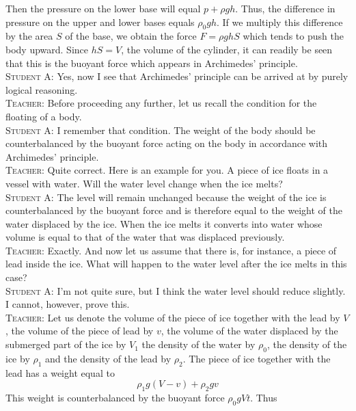 \documentclass[a4paper,sfsidenotes]{tufte-book}
\begin{document}
Then the pressure on the lower base will equal $p+\rho gh$. Thus, the difference in pressure on the upper and lower bases equals $\rho_{0}gh$. If we multiply this difference by the area $S$ of the base, we obtain the force $F=\rho ghS$ which tends to push the body upward. Since $hS=V$, the volume of the cylinder, it can readily be seen that this is the buoyant force which appears in Archimedes' principle.
\\
\textsc{Student A:} Yes, now I see that Archimedes' principle can be arrived at by purely logical reasoning.
\\
\textsc{Teacher:} Before proceeding any further, let us recall the condition for the floating of a body.
\\
\textsc{Student A:} I remember that condition. The weight of the body should be counterbalanced by the buoyant force acting on the body in accordance with Archimedes' principle.
\\
\textsc{Teacher:} Quite correct. Here is an example for you. A piece of ice floats in a vessel with water. Will the water level change when the ice melts?
\\
\textsc{Student A:} The level will remain unchanged because the weight of the ice is counterbalanced by the buoyant force and is therefore equal to the weight of the water displaced by the ice. When the ice melts it converts into water whose volume is equal to that of the water that was displaced previously.
\\
\textsc{Teacher:} Exactly. And now let us assume that there is, for instance, a piece of lead inside the ice. What will happen to the water level after the ice melts in this case?
\\
\textsc{Student A:} I'm not quite sure, but I think the water level should reduce slightly. I cannot, however, prove this.
\\
\textsc{Teacher:} Let us denote the volume of the piece of ice together with the lead by $V$, the volume of the piece of lead by $v$, the volume of the water displaced by the submerged part of the ice by $V_{1}$ the density of the water by $\rho_{0}$, the density of the ice by $\rho_{1}$ and the density of the lead by $\rho_{2}$. The piece of ice together with the lead has a weight equal to\\ 
\begin{equation*}%
\rho_{1} g (V-v) + \rho_{2}gv
\end{equation*}
This weight is counterbalanced by the buoyant force $\rho_{0}gV t$. Thus
\\
\end{document}
